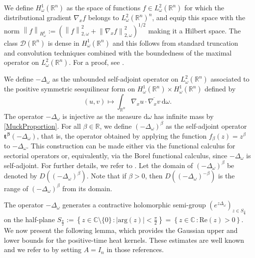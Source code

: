 \documentclass[12pt, letterpaper]{amsart}
\theoremstyle{definition}
\theoremstyle{remark}
\numberwithin{equation}{section}
\begin{document}
We define $H^1_{\omega}(\mathbb{R}^n)$ as the space of functions $f \in L^2_\omega(\mathbb{R}^n)$ for which the distributional gradient $\nabla_x f$ belongs to $L^2_\omega(\mathbb{R}^n)^n$, and equip this space with the norm
$\left\| f \right\|_{H^1_\omega} := ( \left\| f \right\|_{2,\omega}^2 + \left\| \nabla_x f \right\|_{2,\omega}^2 )^{1/2}$ making it a Hilbert space. The class $\mathcal{D}(\mathbb{R}^n)$ is dense in $H^1_{\omega}(\mathbb{R}^n)$ and this follows from standard truncation and convolution techniques combined with the boundedness of the maximal operator on $L^2_\omega(\mathbb{R}^n)$. For a proof, see \cite[Thm. 2.5]{kilpelainen1994weighted}.


We define $-\Delta_\omega$ as the unbounded self-adjoint operator on $L^2_\omega(\mathbb{R}^n)$ associated to the positive symmetric sesquilinear form on $H^1_\omega(\mathbb{R}^n) \times H^1_\omega(\mathbb{R}^n)$ defined by
\begin{equation*}
    (u,v) \mapsto \int_{\mathbb{R}^n} \nabla_x u \cdot \overline{\nabla_x v}  \ \mathrm d \omega.
\end{equation*}
The operator $-\Delta_\omega$ is injective as the measure $\mathrm{d}\omega$ has infinite mass by \eqref{MuckProportion}. For all $\beta \in \mathbb{R}$, we define $(-\Delta_\omega)^\beta$ as the self-adjoint operator $\mathbf{t^{\beta}}(-\Delta_\omega)$, that is, the operator obtained by applying the function $f_\beta(z)=z^\beta$ to $-\Delta_\omega$. This construction can be made either via the functional calculus for sectorial operators or, equivalently, via the Borel functional calculus, since $-\Delta_\omega$ is self-adjoint. For further details, we refer to \cite{reed1980methods, McIntosh86, haase2006functional}. Let the domain of $(-\Delta_\omega)^\beta$ be denoted by $D((-\Delta_\omega)^\beta)$. Note that 
if $\beta>0$, then $D((-\Delta_\omega)^{-\beta})$ is the range of $(-\Delta_\omega)^\beta$ from its domain.

The operator $-\Delta_\omega$ generates a contractive holomorphic semi-group $(e^{z\Delta_\omega})_{z \in S_{\frac{\pi}{2}}}$ on the half-plane $S_{\frac{\pi}{2}}:=\left\{ z \in \mathbb{C}\setminus \{0\} \, : |\mathrm{arg}(z)| < \frac{\pi}{2} \right\} = \left\{ z \in \mathbb{C} \, : \mathrm{Re}(z) > 0 \right\}$. We now present the following lemma, which provides the Gaussian upper and lower  bounds  for the positive-time heat kernels. These estimates are well known and we refer to \cite{cruz2014corrigendum, ataei2024fundamental, baadi2025degenerate} by setting $A = I_n $ in those references. 
\end{document}
